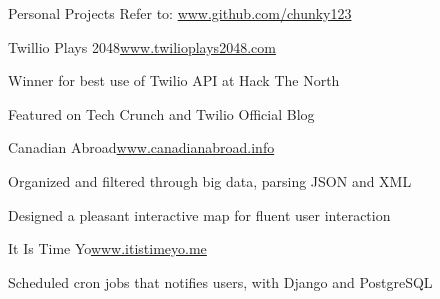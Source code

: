 \documentclass{resume} %
\begin{document}

\begin{rSection}{Personal Projects}
Refer to: \href{www.github.com/chunky123}{www.github.com/chunky123}



\begin{rSubsection}{Twillio Plays 2048}{\href{www.twilioplays2048.com}{www.twilioplays2048.com}}{}{}
\item Winner for best use of Twilio API at Hack The North
\item Featured on Tech Crunch and Twilio Official Blog

\end{rSubsection}

\begin{rSubsection}{Canadian Abroad}{\href{www.canadianabroad.info}{www.canadianabroad.info}}{}{}
\item Organized and filtered through big data, parsing JSON and XML
\item Designed a pleasant interactive map for fluent user interaction

\end{rSubsection}

\begin{rSubsection}{It Is Time Yo}{\href{www.itistimeyo.me}{www.itistimeyo.me}}{}{}
\item Scheduled cron jobs that notifies users, with Django and PostgreSQL

\end{rSubsection}

\end{rSection}
\end{document}
